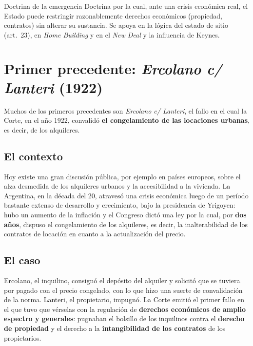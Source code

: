 \documentclass[12pt,oneside]{book}
\begin{document}
\begin{definition}{Doctrina de la emergencia}
Doctrina por la cual, ante una crisis económica real, el Estado puede restringir razonablemente derechos económicos (propiedad, contratos) sin alterar su sustancia. Se apoya en la lógica del estado de sitio (art.~23), en \textit{Home Building} y en el \textit{New Deal} y la influencia de Keynes.
\end{definition}

\section[Ercolano c/ Lanteri]{Primer precedente: \textit{Ercolano c/ Lanteri} (1922)}

Muchos de los primeros precedentes son \textit{Ercolano c/ Lanteri}, el fallo en el cual la Corte, en el año 1922, convalidó \textbf{el congelamiento de las locaciones urbanas}, es decir, de los alquileres.

\subsection{El contexto}

Hoy existe una gran discusión pública, por ejemplo en países europeos, sobre el alza desmedida de los alquileres urbanos y la accesibilidad a la vivienda. La Argentina, en la década del 20, atravesó una crisis económica luego de un período bastante extenso de desarrollo y crecimiento, bajo la presidencia de Yrigoyen: hubo un aumento de la inflación y el Congreso dictó una ley por la cual, por \textbf{dos años}, dispuso el congelamiento de los alquileres, es decir, la inalterabilidad de los contratos de locación en cuanto a la actualización del precio.

\subsection{El caso}

Ercolano, el inquilino, consignó el depósito del alquiler y solicitó que se tuviera por pagado con el precio congelado, con lo que hizo una suerte de convalidación de la norma. Lanteri, el propietario, impugnó. La Corte emitió el primer fallo en el que tuvo que vérselas con la regulación de \textbf{derechos económicos de amplio espectro y generales}: pugnaban el bolsillo de los inquilinos contra el \textbf{derecho de propiedad} y el derecho a la \textbf{intangibilidad de los contratos} de los propietarios.
\end{document}
